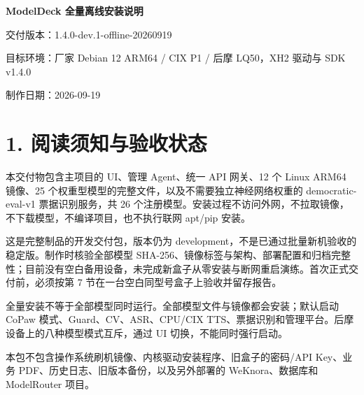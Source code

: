 \documentclass[UTF8,a4paper,zihao=-4,fontset=windows]{ctexart}
\begin{document}
{\LARGE\bfseries\color{ink} ModelDeck 全量离线安装说明}\par\vspace{5mm}
交付版本：1.4.0-dev.1-offline-20260919\par
目标环境：厂家 Debian 12 ARM64 / CIX P1 / 后摩 LQ50，XH2 驱动与 SDK v1.4.0\par
制作日期：2026-09-19\par
\section*{1. 阅读须知与验收状态}
本交付物包含主项目的 UI、管理 Agent、统一 API 网关、12 个 Linux ARM64 镜像、25 个权重型模型的完整文件，以及不需要独立神经网络权重的 democratic-eval-v1 票据识别服务，共 26 个注册模型。安装过程不访问外网，不拉取镜像，不下载模型，不编译项目，也不执行联网 apt/pip 安装。\par
这是完整制品的开发交付包，版本仍为 development，不是已通过批量新机验收的稳定版。制作时核验全部模型 SHA-256、镜像标签与架构、部署配置和归档完整性；目前没有空白备用设备，未完成新盒子从零安装与断网重启演练。首次正式交付前，必须按第 7 节在一台空白同型号盒子上验收并留存报告。\par
全量安装不等于全部模型同时运行。全部模型文件与镜像都会安装；默认启动 CoPaw 模式、Guard、CV、ASR、CPU/CIX TTS、票据识别和管理平台。后摩设备上的八种模型模式互斥，通过 UI 切换，不能同时强行启动。\par
本包不包含操作系统刷机镜像、内核驱动安装程序、旧盒子的密码/API Key、业务 PDF、历史日志、旧版本备份，以及另外部署的 WeKnora、数据库和 ModelRouter 项目。\par
\end{document}
